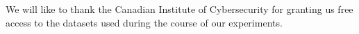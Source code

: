 \documentclass[conference]{IEEEtran}
\begin{document}
We will like to thank the Canadian Institute of Cybersecurity for granting us free access to the datasets used during the course of our experiments.







%
%
%
\end{document}
